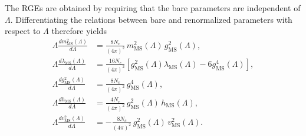 The RGEs are obtained by requiring that the bare parameters are
independent of \(\Lambda\). Differentiating the relations between
bare and renormalized parameters with respect to \(\Lambda\) therefore
yields
\begin{align}
\Lambda\frac{d m^2_{\mathrm{MS}}(\Lambda)}{d\Lambda}
&=
\frac{8N_c}{(4\pi)^2}\,
m^2_{\mathrm{MS}}(\Lambda)\,g^2_{\mathrm{MS}}(\Lambda), \\
\Lambda\frac{d \lambda_{\mathrm{MS}}(\Lambda)}{d\Lambda}
&=
\frac{16N_c}{(4\pi)^2}
\left[
g^2_{\mathrm{MS}}(\Lambda)\lambda_{\mathrm{MS}}(\Lambda)
-
6g^4_{\mathrm{MS}}(\Lambda)
\right], \\
\Lambda\frac{d g^2_{\mathrm{MS}}(\Lambda)}{d\Lambda}
&=
\frac{8N_c}{(4\pi)^2}\,
g^4_{\mathrm{MS}}(\Lambda), \\
\Lambda\frac{d h_{\mathrm{MS}}(\Lambda)}{d\Lambda}
&=
\frac{4N_c}{(4\pi)^2}\,
g^2_{\mathrm{MS}}(\Lambda)\,h_{\mathrm{MS}}(\Lambda), \\
\Lambda\frac{d v^2_{\mathrm{MS}}(\Lambda)}{d\Lambda}
&=
-\frac{8N_c}{(4\pi)^2}\,
g^2_{\mathrm{MS}}(\Lambda)\,v^2_{\mathrm{MS}}(\Lambda).
\end{align}

